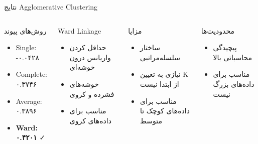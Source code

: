 \documentclass[aspectratio=169]{beamer}
\begin{document}
\begin{frame}{نتایج Agglomerative Clustering}
\begin{columns}
\begin{block}{روش‌های پیوند}
\begin{itemize}
\item Single: -۰.۰۴۲۸
\item Complete: ۰.۳۷۴۶
\item Average: ۰.۳۸۹۶
\item \textbf{Ward: ۰.۴۲۰۱} ✓
\end{itemize}
\end{block}

\begin{block}{Ward Linkage}
\begin{itemize}
\item حداقل کردن واریانس درون خوشه‌ای
\item خوشه‌های فشرده و کروی
\item مناسب برای داده‌های کروی
\end{itemize}
\end{block}

\begin{block}{مزایا}
\begin{itemize}
\item ساختار سلسله‌مراتبی
\item نیازی به تعیین K از ابتدا نیست
\item مناسب برای داده‌های کوچک تا متوسط
\end{itemize}
\end{block}

\begin{block}{محدودیت‌ها}
\begin{itemize}
\item پیچیدگی محاسباتی بالا
\item مناسب برای داده‌های بزرگ نیست
\end{itemize}
\end{block}
\end{columns}
\end{frame}
\end{document}
